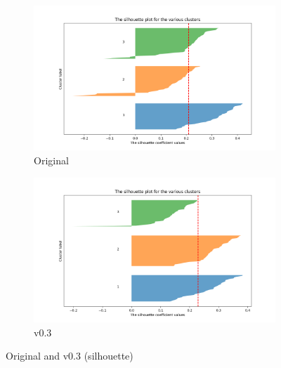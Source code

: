 \documentclass[a4paper,12pt]{article}
\begin{document}
\begin{figure}[H]
\centering
\begin{subfigure}{0.48\textwidth}
\includegraphics[width=\linewidth]{results_silhouette_og.png}
\caption{Original}
\end{subfigure}
\hfill
\begin{subfigure}{0.48\textwidth}
\includegraphics[width=\linewidth]{results_silhouette_v3.png}
\caption{v0.3}
\end{subfigure}
\caption{Original and v0.3 (silhouette)}
\end{figure}
\end{document}
